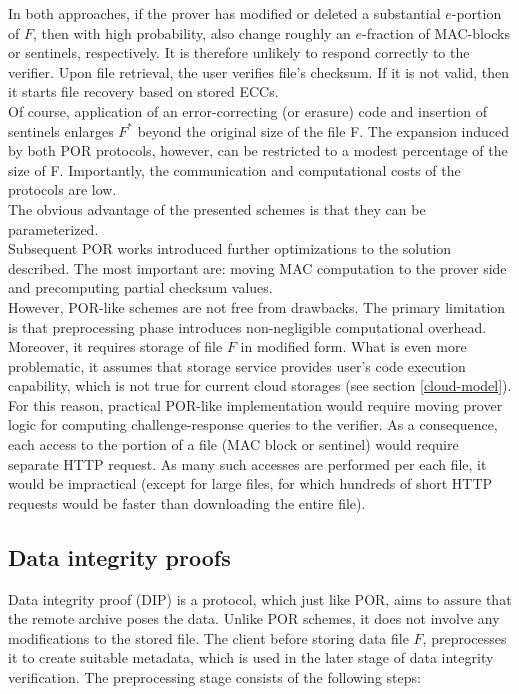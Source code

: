 In both approaches, if the prover has modified or deleted a substantial 
$e$-portion of $F$, then with high probability, also change roughly an
$e$-fraction of MAC-blocks or sentinels, respectively. It is therefore unlikely
to respond correctly to the verifier. Upon file retrieval, the user verifies
file's checksum. If it is not valid, then it starts file recovery based on
stored ECCs.\\

Of course, application of an error-correcting (or erasure) code and insertion
of sentinels enlarges $F^{*}$ beyond the original size of the file F. The
expansion induced by both POR protocols, however, can be restricted to a modest
percentage of the size of F. Importantly, the communication and computational
costs of the protocols are low.\\

The obvious advantage of the presented schemes is that they can be
parameterized.\\

Subsequent POR works \cite{compact-por, por2, hail, venus, iris} introduced
further optimizations to the solution described. The most important are:
moving MAC computation to the prover side and precomputing partial checksum
values.\\

However, POR-like schemes are not free from drawbacks. The primary limitation
is that preprocessing phase introduces non-negligible computational overhead.
Moreover, it requires storage of file $F$ in modified form. What is even more
problematic, it assumes that storage service provides user's code execution
capability, which is not true for current cloud storages 
(see section \ref{cloud-model}). For this reason, practical POR-like
implementation would require moving prover logic for computing 
challenge-response queries to the verifier. As a consequence, each access to
the portion of a file (MAC block or sentinel) would require separate HTTP
request. As many such accesses are performed per each file, it would be
impractical (except for large files, for which hundreds of short HTTP requests
would be faster than downloading the entire file).

\subsection{Data integrity proofs}
Data integrity proof (DIP) \cite{dip} is a protocol, which just like POR, aims
to assure that the remote archive poses the data. Unlike POR schemes, it does
not involve any modifications to the stored file. The client before storing
data file $F$, preprocesses it to create suitable metadata, which is used in
the later stage of data integrity verification. The preprocessing stage
consists of the following steps:

